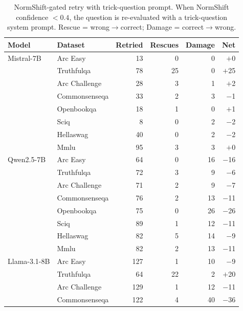 \documentclass[11pt,a4paper]{article}
\begin{document}
\begin{table}[H]
\centering
\caption{NormShift-gated retry with trick-question prompt.
         When NormShift confidence $< 0.4$, the question is re-evaluated
         with a trick-question system prompt.  Rescue = wrong$\to$correct;
         Damage = correct$\to$wrong.}
\label{tab:retry-summary}
\small
\begin{tabular}{@{}llrrrr@{}}
\toprule
Model & Dataset & Retried & Rescues & Damage & Net \\
\midrule
Mistral-7B           & Arc Easy           & 13 & 0 & 0 & $+$0 \\
                     & Truthfulqa         & 78 & 25 & 0 & $+$25 \\
                     & Arc Challenge      & 28 & 3 & 1 & $+$2 \\
                     & Commonsenseqa      & 33 & 2 & 3 & $-$1 \\
                     & Openbookqa         & 18 & 1 & 0 & $+$1 \\
                     & Sciq               & 8 & 0 & 2 & $-$2 \\
                     & Hellaswag          & 40 & 0 & 2 & $-$2 \\
                     & Mmlu               & 95 & 3 & 3 & $+$0 \\
\midrule
Qwen2.5-7B           & Arc Easy           & 64 & 0 & 16 & $-$16 \\
                     & Truthfulqa         & 72 & 3 & 9 & $-$6 \\
                     & Arc Challenge      & 71 & 2 & 9 & $-$7 \\
                     & Commonsenseqa      & 76 & 2 & 13 & $-$11 \\
                     & Openbookqa         & 75 & 0 & 26 & $-$26 \\
                     & Sciq               & 89 & 1 & 12 & $-$11 \\
                     & Hellaswag          & 82 & 5 & 14 & $-$9 \\
                     & Mmlu               & 82 & 2 & 13 & $-$11 \\
\midrule
Llama-3.1-8B         & Arc Easy           & 127 & 1 & 10 & $-$9 \\
                     & Truthfulqa         & 64 & 22 & 2 & $+$20 \\
                     & Arc Challenge      & 129 & 1 & 12 & $-$11 \\
                     & Commonsenseqa      & 122 & 4 & 40 & $-$36 \\

\end{tabular}
\end{table}
\end{document}

